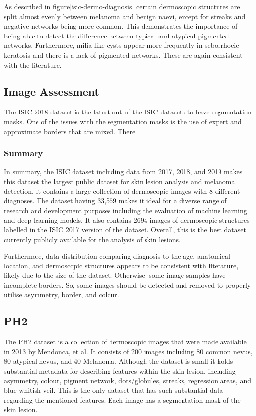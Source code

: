 As described in figure\ref{isic-dermo-diagnosis} certain dermoscopic structures are split almost evenly between melanoma and benign naevi, except for streaks and negative networks being more common. This demonstrates the importance of being able to detect the difference between typical and atypical pigmented networks. Furthermore, milia-like cysts appear more frequently in seborrhoeic keratosis and there is a lack of pigmented networks. These are again consistent with the literature.

\subsection{Image Assessment}
The ISIC 2018 dataset is the latest out of the ISIC datasets to have segmentation masks. One of the issues with the segmentation masks is the use of expert and approximate borders that are mixed. There


\subsubsection{Summary}
In summary, the ISIC dataset including data from 2017, 2018, and 2019 makes this dataset the largest public dataset for skin lesion analysis and melanoma detection. It contains a large collection of dermoscopic images with 8 different diagnoses. The dataset having 33,569 makes it ideal for a diverse range of research and development purposes including the evaluation of machine learning and deep learning models. It also contains 2694 images of dermoscopic structures labelled in the ISIC 2017 version of the dataset. Overall, this is the best dataset currently publicly available for the analysis of skin lesions.

Furthermore, data distribution comparing diagnosis to the age, anatomical location, and dermoscopic structures appears to be consistent with literature\cite{}, likely due to the size of the dataset. Otherwise, some image samples have incomplete borders. So, some images should be detected and removed to properly utilise asymmetry, border, and colour.

\subsection{PH2}
The PH2 dataset is a collection of dermoscopic images that were made available in 2013 by Mendonca, et al\cite{}. It consists of 200 images including 80 common nevus, 80 atypical nevus, and 40 Melanoma. Although the dataset is small it holds substantial metadata for describing features within the skin lesion, including asymmetry, colour, pigment network, dots/globules, streaks, regression areas, and blue-whitish veil. This is the only dataset that has such substantial data regarding the mentioned features. Each image has a segmentation mask of the skin lesion.

